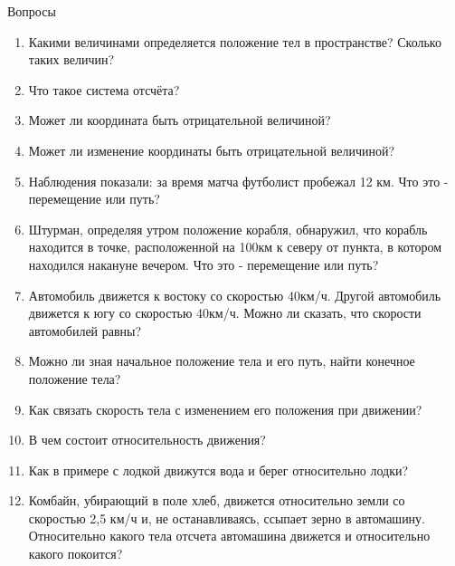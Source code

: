 \documentclass[a5paper, 10pt]{diss_4}
\renewcommand{\'}{\,'}
\begin{document}
\begin{center}
   Вопросы
\end{center}
\begin{enumerate}
\item Какими величинами определяется положение тел в пространстве? Сколько таких величин?
\item Что такое система отсчёта?
\item Может ли координата быть отрицательной величиной?
\item Может ли изменение координаты быть отрицательной величиной?
\item Наблюдения показали: за время матча футболист пробежал 12 км. Что это - перемещение или путь?
\item Штурман, определяя утром положение корабля, обнаружил, что корабль находится в точке, расположенной на 100км к северу от пункта, в котором находился накануне вечером. Что это - перемещение или путь?
\item Автомобиль движется к востоку со скоростью 40км/ч. Другой автомобиль движется к югу со скоростью 40км/ч. Можно ли сказать, что скорости автомобилей равны?
\item Можно ли зная начальное положение тела и его путь, найти конечное положение тела?
\item Как связать скорость тела с изменением его положения при движении?
\item В   чем   состоит   относительность   движения?
\item Как   в   примере   с   лодкой   движутся вода и берег относительно лодки?
\item Комбайн,   убирающий   в   поле    хлеб, движется относительно земли со скоростью 2,5 км/ч и, не останавливаясь, ссыпает зерно в автомашину. Относительно какого тела отсчета автомашина движется и относительно какого покоится?
\end{enumerate}
\end{document}
